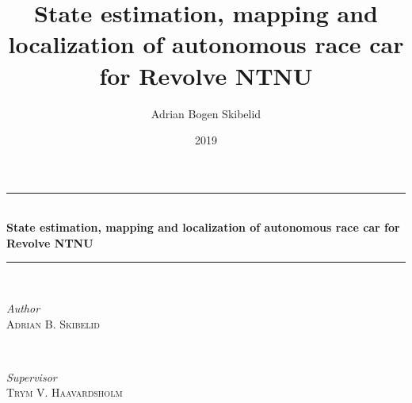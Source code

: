 \documentclass[pdftex,10pt,b5paper,twoside]{book}
\title{State estimation, mapping and localization of autonomous race car for Revolve NTNU}
\author{Adrian Bogen Skibelid}
\date{2019}
\begin{document}
\begin{titlepage} %
	\newcommand{\HRule}{\rule{\linewidth}{0.5mm}} %
	
	\center %
	
	
	
	
	
	
	\HRule\\[0.4cm]
	
	{\huge\bfseries 
	{
	State estimation, mapping and localization of autonomous race car for Revolve NTNU}\\[0.4cm] %
	}
	
	\HRule\\[1.5cm]
	
	
	\begin{minipage}{0.4\textwidth}
		\begin{flushleft}
			\large
			\textit{Author}\\
			\textsc{Adrian B. Skibelid} %
		\end{flushleft}
	\end{minipage}
	~
	\begin{minipage}{0.4\textwidth}
		\begin{flushright}
			\large
			\textit{Supervisor}\\
			\textsc{Trym V. Haavardsholm} %
		\end{flushright}
	\end{minipage}
	

\end{titlepage}
\end{document}
